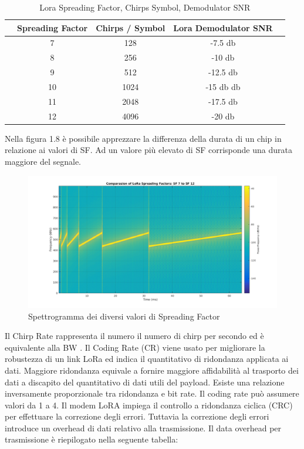 \documentclass[12pt,a4paper,openright,twoside]{report}
\begin{document}
\begin{table}[h]
\begin{center}
\begin{tabular}{lcccc}
&Spreading Factor&Chirps / Symbol&Lora Demodulator SNR\\ \hline\hline
&7&128&-7.5 db\\
\hline
&8&256&-10 db\\
\hline
&9&512&-12.5 db\\
\hline
&10&1024&-15 db db\\
\hline
&11&2048&-17.5 db\\
\hline
&12&4096&-20 db\\
\hline
\end{tabular}
\caption[Lora Spreading Factor, Chirps Symbol, Demodulator SNR]{Lora Spreading Factor, Chirps Symbol, Demodulator SNR}\label{tab:due}
\end{center}
\end{table}

Nella figura 1.8 \`e possibile apprezzare la differenza della durata di un chip in relazione ai valori di SF. Ad un valore pi\`u elevato di SF corrisponde una durata maggiore del segnale.  

\begin{figure}[h]                      
\begin{center} 
\includegraphics[width=\textwidth]{SF_Comparasion_7_12.png}
\caption[Spettrogramma dei diversi valori di Spreading Factor]{Spettrogramma dei diversi valori di Spreading Factor}\label{fig:prima}
\end{center}
\end{figure}

Il Chirp Rate rappresenta il numero il numero di chirp per secondo ed \`e equivalente alla BW \cite{K21}.
Il Coding Rate (CR) viene usato per migliorare la robustezza di un link LoRa ed indica il quantitativo di ridondanza applicata ai dati. Maggiore ridondanza equivale a fornire maggiore affidabilit\`a al trasporto dei dati a discapito del quantitativo di dati utili del payload. Esiste una relazione inversamente proporzionale tra ridondanza e bit rate. Il coding rate pu\`o assumere valori da 1 a 4.
Il modem LoRA impiega il controllo a ridondanza ciclica (CRC) per effettuare la correzione degli errori. Tuttavia la correzione degli errori introduce un overhead di dati relativo alla trasmissione. Il data overhead per trasmissione \`e riepilogato nella seguente tabella:
\end{document}
